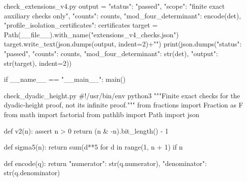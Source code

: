 \begin{filecontents*}[overwrite]{check_extensions_v4.py}
    output = {"status": "passed", "scope": "finite exact auxiliary checks only",
              "counts": counts, "mod_four_determinant": encode(det),
              "profile_isolation_certificates": certificates}
    target = Path(__file__).with_name("extensions_v4_checks.json")
    target.write_text(json.dumps(output, indent=2)+"\n")
    print(json.dumps({"status": "passed", "counts": counts,
                      "mod_four_determinant": str(det), "output": str(target)}, indent=2))


if __name__ == "__main__":
    main()

\end{filecontents*}
\begin{filecontents*}[overwrite]{check_dyadic_height.py}
#!/usr/bin/env python3
"""Finite exact checks for the dyadic-height proof, not its infinite proof."""
from fractions import Fraction as F
from math import factorial
from pathlib import Path
import json


def v2(n):
    assert n > 0
    return (n & -n).bit_length() - 1


def sigma5(n):
    return sum(d**5 for d in range(1, n + 1) if n %


def encode(q):
    return {"numerator": str(q.numerator), "denominator": str(q.denominator)}



\end{filecontents*}
